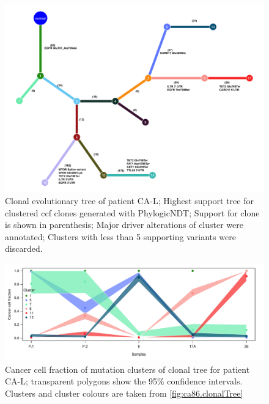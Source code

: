 \begin{figure}[ht]
\centering
\includegraphics[width=.99\linewidth]{Figures/CASCADE/CA86/CA86.clonaltree.pdf}
\caption[Clonal evolutionary tree CA-L]{Clonal evolutionary tree of patient CA-L; Highest support tree for clustered ccf clones generated with PhylogicNDT; Support for clone is shown in parenthesis; Major driver alterations of cluster were annotated; Clusters with less than 5 supporting variants were discarded.} \label{fig:ca86.clonalTree}
\end{figure}

\begin{figure}[ht]
\centering
\includegraphics[width=.99\linewidth]{Figures/CASCADE/CA86/CA86.ccf_cluster.pdf}
\caption[Cancer cell fraction of mutation clusters of clonal tree for patient CA-L]{Cancer cell fraction of mutation clusters of clonal tree for patient CA-L; transparent polygons show the 95\% confidence intervals. Clusters and cluster colours are taken from \protect\autoref{fig:ca86.clonalTree}} \label{fig:ca86.ccfCluster}
\end{figure}







\cleardoublepage
